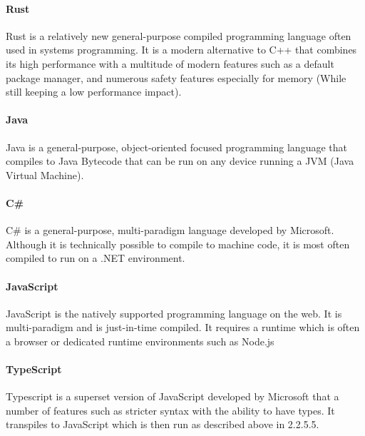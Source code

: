 \paragraph{Rust}
Rust is a relatively new general-purpose compiled programming language often used in systems programming. It is a modern alternative to C++ that combines its high performance with a multitude of modern features such as a default package manager, and numerous safety features especially for memory (While still keeping a low performance impact).

\paragraph{Java}
Java is a general-purpose, object-oriented focused programming language that compiles to Java Bytecode that can be run on any device running a JVM (Java Virtual Machine).

\paragraph{C\#}
C\# is a general-purpose, multi-paradigm language developed by Microsoft. Although it is technically possible to compile to machine code, it is most often compiled to run on a .NET environment.

\paragraph{JavaScript}
JavaScript is the natively supported programming language on the web. It is multi-paradigm and is just-in-time compiled. It requires a runtime which is often a browser or dedicated runtime environments such as Node.js

\paragraph{TypeScript}
Typescript is a superset version of JavaScript developed by Microsoft that a number of features such as stricter syntax with the ability to have types. It transpiles to JavaScript which is then run as described above in 2.2.5.5.




